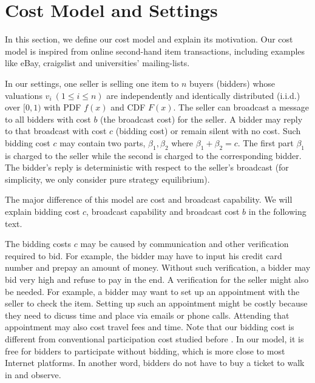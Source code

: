 \section{Cost Model and Settings}

In this section, we define our cost model and explain its motivation. Our
cost model is inspired from online second-hand item transactions, including
examples like eBay, craigslist and universities' mailing-lists.


\begin{definition}\label{def:model}

In our settings, one seller is selling one item to $n$ buyers (bidders)
whose valuations $v_i~(1 \leq i \leq n)$ are independently and identically
distributed (i.i.d.) over $[0, 1)$ with PDF $f(x)$ and CDF $F(x)$. The seller
can broadcast a message to all bidders with cost $b$ (the broadcast cost) for
the seller.  A bidder may reply to that broadcast with cost $c$ (bidding cost)
or remain silent with no cost. Such bidding cost $c$ may contain two parts,
$\beta_1, \beta_2$ where $\beta_1+\beta_2 = c$.  The first part $\beta_1$ is
charged to the seller while the second is charged to the corresponding bidder.
The bidder's reply is deterministic with respect to the seller's
broadcast (for simplicity, we only consider pure strategy equilibrium).

\end{definition}

The major difference of this model are cost and broadcast capability. We will
explain bidding cost $c$, broadcast capability and broadcast cost $b$ in
the following text.

The bidding costs $c$ may be caused by communication and other verification
required to bid. For example, the bidder may have to input his credit card
number and prepay an amount of money. Without such verification, a bidder may
bid very high and refuse to pay in the end. A verification for the seller might
also be needed. For example, a bidder may want to set up an appointment with
the seller to check the item.  Setting up such an appointment might be costly
because they need to dicuss time and place via emails or phone calls.
Attending that appointment may also cost travel fees and time.  Note that our
bidding cost is different from conventional participation cost studied before
\cite{Stegeman95:ParticipationCost, Tan2006:EquilibriaParticipationCost}. In
our model, it is free for bidders to participate without bidding, which is more
close to most Internet platforms. In another word, bidders do not have to buy a
ticket to walk in and observe.

